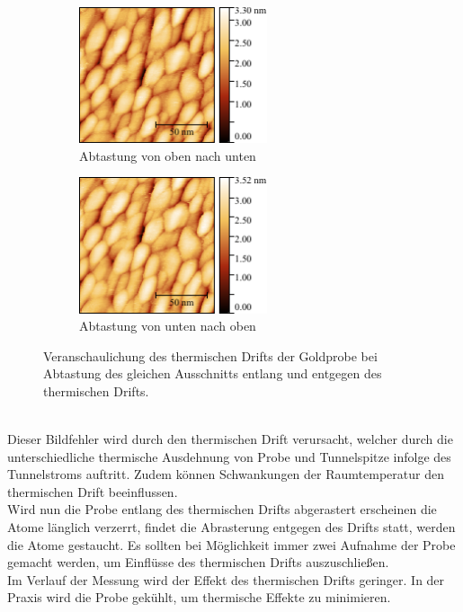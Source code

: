 \documentclass[a4paper,twoside,final]{article}
\begin{document}
\begin{figure}[htp]
    \centering
    \begin{subfigure}{0.45\textwidth}
        \includegraphics[height=4cm]{Bilder/Image01966_Drift_obenunten.pdf}
        \caption{Abtastung von oben nach unten}
    \end{subfigure}
    \hspace{0.5cm}
    \begin{subfigure}{0.45\textwidth}
        \includegraphics[height=4cm]{Bilder/Image01965_Drift_untenoben.pdf}
        \caption{Abtastung von unten nach oben}
    \end{subfigure}
    \caption{Veranschaulichung des thermischen Drifts der Goldprobe bei Abtastung des gleichen Ausschnitts entlang und entgegen des thermischen Drifts.}
    \label{fig:ThermischerDrift}
\end{figure}\\
Dieser Bildfehler wird durch den thermischen Drift verursacht, welcher durch die unterschiedliche thermische Ausdehnung von Probe und Tunnelspitze infolge des Tunnelstroms auftritt. Zudem können Schwankungen der Raumtemperatur den thermischen Drift beeinflussen.\\
Wird nun die Probe entlang des thermischen Drifts abgerastert erscheinen die Atome länglich verzerrt, findet die Abrasterung entgegen des Drifts statt, werden die Atome gestaucht. Es sollten bei Möglichkeit immer zwei Aufnahme der Probe gemacht werden, um Einflüsse des thermischen Drifts auszuschließen.\\
Im Verlauf der Messung wird der Effekt des thermischen Drifts geringer. In der Praxis wird die Probe gekühlt, um thermische Effekte zu minimieren.
\end{document}
